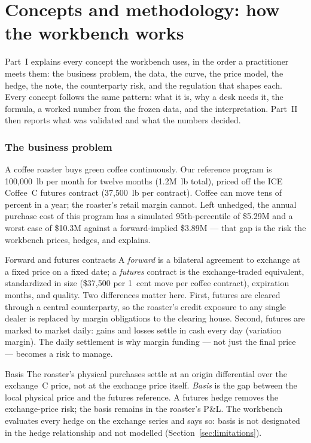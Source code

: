 \documentclass[11pt,a4paper]{article}
\newcommand{\usd}{\$}
\begin{document}
\clearpage
\part{Concepts and methodology: how the workbench works}

Part~I explains every concept the workbench uses, in the order a
practitioner meets them: the business problem, the data, the curve, the
price model, the hedge, the note, the counterparty risk, and the regulation
that shapes each. Every concept follows the same pattern: what it is, why a
desk needs it, the formula, a worked number from the frozen data, and the
interpretation. Part~II then reports what was validated and what the numbers
decided.

\section{The business problem}

A coffee roaster buys green coffee continuously. Our reference program is
100{,}000~lb per month for twelve months (1.2M~lb total), priced off the ICE
Coffee~C futures contract (37{,}500~lb per contract). Coffee can move tens of
percent in a year; the roaster's retail margin cannot. Left unhedged, the
annual purchase cost of this program has a simulated 95th-percentile of
\usd{}5.29M and a worst case of \usd{}10.3M against a forward-implied
\usd{}3.89M --- that gap is the risk the workbench prices, hedges, and
explains.

\begin{concept}{Forward and futures contracts}
A \emph{forward} is a bilateral agreement to exchange at a fixed price on a
fixed date; a \emph{futures} contract is the exchange-traded equivalent,
standardized in size (\usd{}37{,}500 per 1~cent move per coffee contract),
expiration months, and quality. Two differences matter here. First,
futures are cleared through a central counterparty, so the roaster's
credit exposure to any single dealer is replaced by margin obligations to
the clearing house. Second, futures are marked to market daily: gains and
losses settle in cash every day (variation margin). The daily settlement
is why margin funding --- not just the final price --- becomes a risk to
manage.
\end{concept}

\begin{concept}{Basis}
The roaster's physical purchases settle at an origin differential over the
exchange~C price, not at the exchange price itself. \emph{Basis} is the gap
between the local physical price and the futures reference. A futures hedge
removes the exchange-price risk; the basis remains in the roaster's P\&L.
The workbench evaluates every hedge on the exchange series and says so:
basis is not designated in the hedge relationship and not modelled
(Section~\ref{sec:limitations}).
\end{concept}
\end{document}
